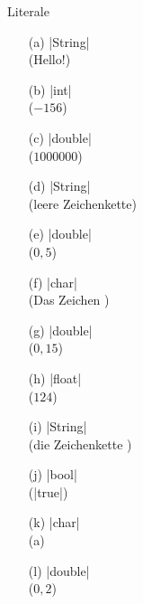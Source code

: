 \begin{exercise}{Literale}
\begin{solution}
\begin{center}
\begin{minipage}{0.3\textwidth}
\begin{itemize}
\item[(a)] \code|String| \\ (Hello!)
\item[(b)] \code|int|    \\ ($-156$)
\item[(c)] \code|double| \\ ($1000000$)
\item[(d)] \code|String| \\ (leere Zeichenkette)
\end{itemize}
\end{minipage}
\begin{minipage}{0.3\textwidth}
\begin{itemize}
\item[(e)] \code|double| \\ ($0{,}5$)
\item[(f)] \code|char|   \\ (Das Zeichen \grqq)
\item[(g)] \code|double| \\ ($0{,}15$)
\item[(h)] \code|float|  \\ ($124$)
\end{itemize}
\end{minipage}
\begin{minipage}{0.3\textwidth}
\begin{itemize}
\item[(i)] \code|String| \\ (die Zeichenkette \grqq)
\item[(j)] \code|bool| \\ (\code|true|)
\item[(k)] \code|char|    \\ (a)
\item[(l)] \code|double|  \\ ($0{,}2$)
\end{itemize}
\end{minipage}
\end{center}
\end{solution}

\end{exercise}
